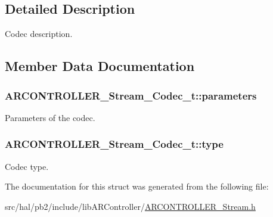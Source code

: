 \subsection{Detailed Description}
Codec description. 

\subsection{Member Data Documentation}
\subsubsection[{\texorpdfstring{parameters}{parameters}}]{ A\+R\+C\+O\+N\+T\+R\+O\+L\+L\+E\+R\+\_\+\+Stream\+\_\+\+Codec\+\_\+t\+::parameters}\hypertarget{struct_a_r_c_o_n_t_r_o_l_l_e_r___stream___codec__t_a3924ba1598ea2421fcaf0ee3e193481f}{}\label{struct_a_r_c_o_n_t_r_o_l_l_e_r___stream___codec__t_a3924ba1598ea2421fcaf0ee3e193481f}
Parameters of the codec. 
\subsubsection[{\texorpdfstring{type}{type}}]{ A\+R\+C\+O\+N\+T\+R\+O\+L\+L\+E\+R\+\_\+\+Stream\+\_\+\+Codec\+\_\+t\+::type}\hypertarget{struct_a_r_c_o_n_t_r_o_l_l_e_r___stream___codec__t_a8b02e9ac73436d5e63abb5676a65b851}{}\label{struct_a_r_c_o_n_t_r_o_l_l_e_r___stream___codec__t_a8b02e9ac73436d5e63abb5676a65b851}
Codec type. 

The documentation for this struct was generated from the following file\+:\begin{DoxyCompactItemize}
\item 
src/hal/pb2/include/lib\+A\+R\+Controller/\hyperlink{_a_r_c_o_n_t_r_o_l_l_e_r___stream_8h}{A\+R\+C\+O\+N\+T\+R\+O\+L\+L\+E\+R\+\_\+\+Stream.\+h}\end{DoxyCompactItemize}
